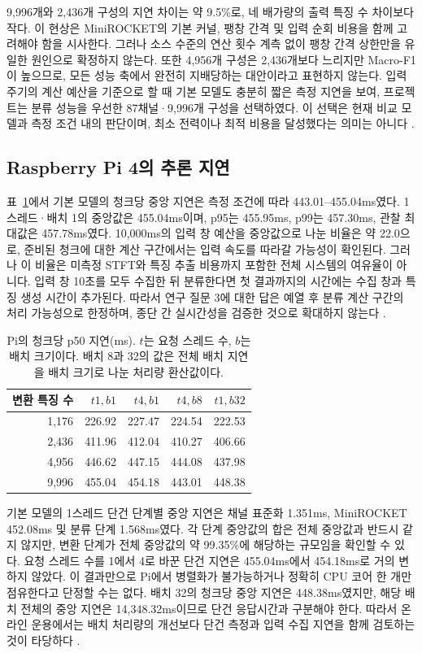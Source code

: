 \documentclass[11pt,a4paper]{article}
\newcommand{\sourceproject}{\citep{project2026}}
\begin{document}
9,996개와 2,436개 구성의 지연 차이는 약 9.5\%로, 네 배가량의 출력 특징 수 차이보다 작다.
이 현상은 MiniROCKET의 기본 커널, 팽창 간격 및 입력 순회 비용을 함께 고려해야 함을 시사한다.
그러나 소스 수준의 연산 횟수 계측 없이 팽창 간격 상한만을 유일한 원인으로 확정하지 않는다.
또한 4,956개 구성은 2,436개보다 느리지만 Macro-F1이 높으므로, 모든 성능 축에서 완전히 지배당하는 대안이라고 표현하지 않는다.
입력 주기의 계산 예산을 기준으로 할 때 기본 모델도 충분히 짧은 측정 지연을 보여, 프로젝트는 분류 성능을 우선한 87채널·9,996개 구성을 선택하였다.
이 선택은 현재 비교 모델과 측정 조건 내의 판단이며, 최소 전력이나 최적 비용을 달성했다는 의미는 아니다 \sourceproject.

\subsection{Raspberry Pi 4의 추론 지연}
표~\ref{tab:latency}에서 기본 모델의 청크당 중앙 지연은 측정 조건에 따라 443.01--455.04ms였다.
1스레드·배치 1의 중앙값은 455.04ms이며, p95는 455.95ms, p99는 457.30ms, 관찰 최대값은 457.78ms였다.
10,000ms의 입력 창 예산을 중앙값으로 나눈 비율은 약 22.0으로, 준비된 청크에 대한 계산 구간에서는 입력 속도를 따라갈 가능성이 확인된다.
그러나 이 비율은 미측정 STFT와 특징 추출 비용까지 포함한 전체 시스템의 여유율이 아니다.
입력 창 10초를 모두 수집한 뒤 분류한다면 첫 결과까지의 시간에는 수집 창과 특징 생성 시간이 추가된다.
따라서 연구 질문 3에 대한 답은 예열 후 분류 계산 구간의 처리 가능성으로 한정하며, 종단 간 실시간성을 검증한 것으로 확대하지 않는다 \sourceproject.

\begin{table}[htbp]
\centering
\caption{Pi의 청크당 p50 지연(ms). $t$는 요청 스레드 수, $b$는 배치 크기이다. 배치 8과 32의 값은 전체 배치 지연을 배치 크기로 나눈 처리량 환산값이다.}
\label{tab:latency}
\begingroup\small\setlength{\tabcolsep}{5pt}
\begin{tabular}{rrrrr}
\toprule
변환 특징 수 & $t1,b1$ & $t4,b1$ & $t4,b8$ & $t1,b32$ \\
\midrule
1,176 & 226.92 & 227.47 & 224.54 & 222.53 \\
2,436 & 411.96 & 412.04 & 410.27 & 406.66 \\
4,956 & 446.62 & 447.15 & 444.08 & 437.98 \\
9,996 & 455.04 & 454.18 & 443.01 & 448.38 \\
\bottomrule
\end{tabular}
\endgroup
\end{table}

기본 모델의 1스레드 단건 단계별 중앙 지연은 채널 표준화 1.351ms, MiniROCKET 452.08ms 및 분류 단계 1.568ms였다.
각 단계 중앙값의 합은 전체 중앙값과 반드시 같지 않지만, 변환 단계가 전체 중앙값의 약 99.35\%에 해당하는 규모임을 확인할 수 있다.
요청 스레드 수를 1에서 4로 바꾼 단건 지연은 455.04ms에서 454.18ms로 거의 변하지 않았다.
이 결과만으로 Pi에서 병렬화가 불가능하거나 정확히 CPU 코어 한 개만 점유한다고 단정할 수는 없다.
배치 32의 청크당 중앙 지연은 448.38ms였지만, 해당 배치 전체의 중앙 지연은 14,348.32ms이므로 단건 응답시간과 구분해야 한다.
따라서 온라인 운용에서는 배치 처리량의 개선보다 단건 측정과 입력 수집 지연을 함께 검토하는 것이 타당하다 \sourceproject.
\end{document}

